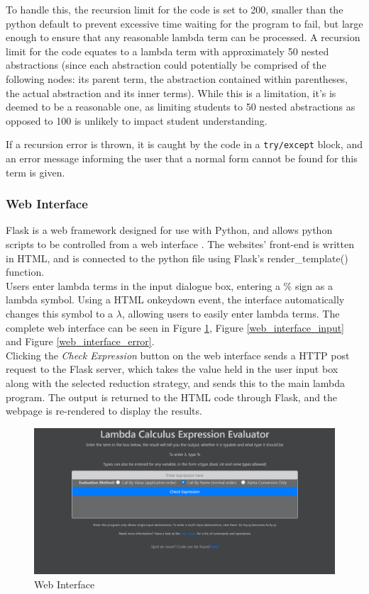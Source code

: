 \documentclass[a4paper,12pt]{report}
\begin{document}
To handle this, the recursion limit for the code is set to 200, smaller than the python default to prevent excessive time waiting for the program to fail, but large enough to ensure that any reasonable lambda term can be processed. A recursion limit for the code equates to a lambda term with approximately 50 nested abstractions (since each abstraction could potentially be comprised of the following nodes: its parent term, the abstraction contained within parentheses, the actual abstraction and its inner terms). While this is a limitation, it's is deemed to be a reasonable one, as limiting students to 50 nested abstractions as opposed to 100 is unlikely to impact student understanding.

If a recursion error is thrown, it is caught by the code in a \texttt{try/except} block, and an error message informing the user that a normal form cannot be found for this term is given.

\subsubsection{Web Interface}

Flask is a web framework designed for use with Python, and allows python scripts to be controlled from a web interface \cite{FullStack2019}. The websites' front-end is written in HTML, and is connected to the python file using Flask's render_template() function.\\

Users enter lambda terms in the input dialogue box, entering a \% sign as a lambda symbol. Using a HTML onkeydown event, the interface automatically changes this symbol to a $\lambda$, allowing users to easily enter lambda terms. The complete web interface can be seen in Figure \ref{web_interface_no_input}, Figure \ref{web_interface_input} and Figure \ref{web_interface_error}.\\

Clicking the \textit{Check Expression} button on the web interface sends a HTTP post request to the Flask server, which takes the value held in the user input box along with the selected reduction strategy, and sends this to the main lambda program. The output is returned to the HTML code through Flask, and the webpage is re-rendered to display the results.\\

\begin{figure}[p]
	\includegraphics[scale=0.4]{images/web_interface_no_input}
	\centering
	\caption{Web Interface}
	\label{web_interface_no_input}
\end{figure}
\end{document}
